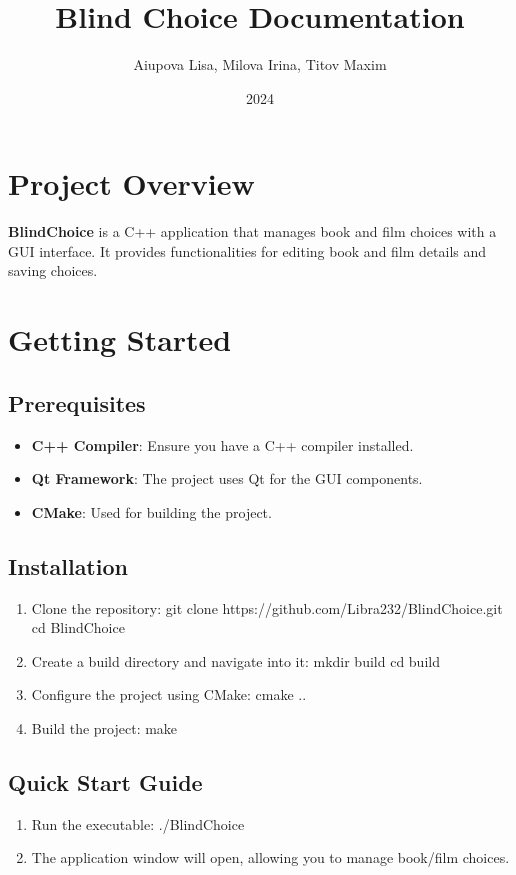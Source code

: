 \documentclass{article}
\title{Blind Choice Documentation}
\author{Aiupova Lisa, Milova Irina, Titov Maxim}
\date{2024}
\begin{document}
\maketitle

\tableofcontents

\section{Project Overview}
\textbf{BlindChoice} is a C++ application that manages book and film choices with a GUI interface. It provides functionalities for editing book and film details and saving choices.

\section{Getting Started}

\subsection{Prerequisites}
\begin{itemize}
    \item \textbf{C++ Compiler}: Ensure you have a C++ compiler installed.
    \item \textbf{Qt Framework}: The project uses Qt for the GUI components.
    \item \textbf{CMake}: Used for building the project.
\end{itemize}

\subsection{Installation}
\begin{enumerate}
    \item Clone the repository:
    git clone https://github.com/Libra232/BlindChoice.git
    cd BlindChoice
    \item Create a build directory and navigate into it:
    mkdir build
    cd build
    \item Configure the project using CMake:
    cmake ..
    \item Build the project:
    make
\end{enumerate}

\subsection{Quick Start Guide}
\begin{enumerate}
    \item Run the executable:
    ./BlindChoice
    \item The application window will open, allowing you to manage book/film choices.
\end{enumerate}
\end{document}
